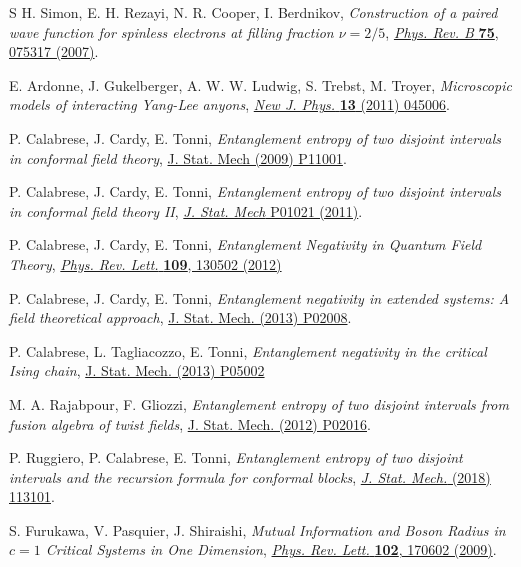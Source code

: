 \documentclass[a4paper,11pt]{article}
\begin{document}
\begin{thebibliography}{99}
 S H. Simon, E. H. Rezayi, N. R. Cooper, I. Berdnikov, \emph{Construction of a paired wave function for spinless electrons at filling fraction $\nu=2/5$}, \href{https://doi.org/10.1103/PhysRevB.75.075317}{\emph{Phys. Rev. B} {\bf 75}, 075317 (2007)}.

 E. Ardonne, J. Gukelberger, A. W. W. Ludwig, S. Trebst, M. Troyer, \emph{Microscopic models of interacting Yang-Lee anyons},
\href{https://doi.org/10.1088/1367-2630/13/4/045006}{\emph{New J. Phys.} {\bf 13} (2011) 045006}.

 P. Calabrese, J. Cardy, E. Tonni, \emph{Entanglement entropy of two disjoint intervals in conformal field theory},
\href{https://doi.org/10.1088/1742-5468/2009/11/P11001}{J. Stat. Mech (2009) P11001}.

 P. Calabrese, J. Cardy, E. Tonni, \emph{Entanglement entropy of two disjoint intervals in conformal field theory II}, \href{https://doi.org/10.1088/1742-5468/2011/01/P01021}{\emph{J. Stat. Mech} P01021 (2011)}.


 P. Calabrese, J. Cardy, E. Tonni, \emph{Entanglement Negativity in Quantum Field Theory},
\href{https://doi.org/10.1103/PhysRevLett.109.130502}{\emph{Phys. Rev. Lett.} {\bf 109}, 130502 (2012)}

 P. Calabrese, J. Cardy, E. Tonni, \emph{Entanglement negativity in extended systems:  A field theoretical approach},
\href{https://doi.org/10.1088/1742-5468/2013/02/P02008}{J. Stat. Mech. (2013) P02008}.

 P. Calabrese, L. Tagliacozzo, E. Tonni, \emph{Entanglement negativity in the critical Ising chain}, 
\href{https://doi.org/10.1088/1742-5468/2013/05/P05002}{J. Stat. Mech. (2013) P05002}

 M. A. Rajabpour, F. Gliozzi, \emph{Entanglement entropy of two disjoint intervals from fusion algebra of twist fields},
\href{https://doi.org/10.1088/1742-5468/2012/02/P02016}{J. Stat. Mech. (2012) P02016}.

 P. Ruggiero, P. Calabrese, E. Tonni, \emph{Entanglement entropy of two disjoint intervals and the recursion formula
for conformal blocks}, \href{https://doi.org/10.1088/1742-5468/aae5a8}{\emph{J. Stat. Mech.} (2018) 113101}.

  S. Furukawa, V. Pasquier, J. Shiraishi, \emph{Mutual Information and Boson Radius in $c=1$ Critical Systems in One Dimension}, \href{https://doi.org/10.1103/PhysRevLett.102.170602}{\emph{Phys. Rev. Lett.} {\bf 102}, 170602 (2009)}.


\end{thebibliography}
\end{document}
